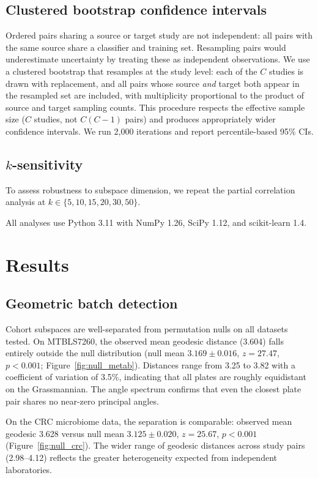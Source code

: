 \documentclass{article}
\begin{document}
\subsection{Clustered bootstrap confidence intervals}

Ordered pairs sharing a source or target study are not independent: all pairs with the same source share a classifier and training set. Resampling pairs would underestimate uncertainty by treating these as independent observations. We use a clustered bootstrap that resamples at the study level: each of the $C$ studies is drawn with replacement, and all pairs whose source \emph{and} target both appear in the resampled set are included, with multiplicity proportional to the product of source and target sampling counts. This procedure respects the effective sample size ($C$ studies, not $C(C-1)$ pairs) and produces appropriately wider confidence intervals. We run 2{,}000 iterations and report percentile-based 95\% CIs.

\subsection{$k$-sensitivity}

To assess robustness to subspace dimension, we repeat the partial correlation analysis at $k \in \{5, 10, 15, 20, 30, 50\}$.

All analyses use Python 3.11 with NumPy 1.26, SciPy 1.12, and scikit-learn 1.4.


\section{Results}

\subsection{Geometric batch detection}
\label{sec:batch}

Cohort subspaces are well-separated from permutation nulls on all datasets tested. On MTBLS7260, the observed mean geodesic distance (3.604) falls entirely outside the null distribution (null mean $3.169 \pm 0.016$, $z = 27.47$, $p < 0.001$; Figure~\ref{fig:null_metab}). Distances range from 3.25 to 3.82 with a coefficient of variation of 3.5\%, indicating that all plates are roughly equidistant on the Grassmannian. The angle spectrum confirms that even the closest plate pair shares no near-zero principal angles.

On the CRC microbiome data, the separation is comparable: observed mean geodesic 3.628 versus null mean $3.125 \pm 0.020$, $z = 25.67$, $p < 0.001$ (Figure~\ref{fig:null_crc}). The wider range of geodesic distances across study pairs (2.98--4.12) reflects the greater heterogeneity expected from independent laboratories.
\end{document}
